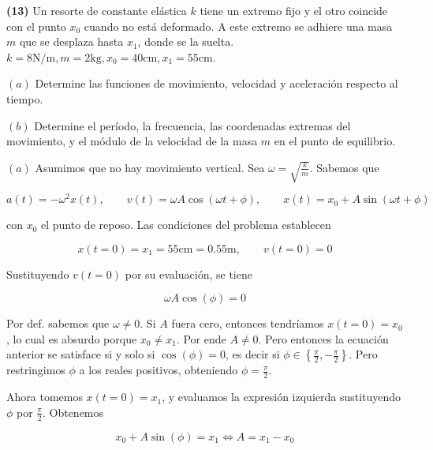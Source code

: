 \documentclass[12pt]{article}
\theoremstyle{definition}
\begin{document}
\pagebreak 

\begin{shaded}
    \textbf{(13)} Un resorte de constante elástica $k$ tiene un extremo fijo y
    el otro coincide con el punto $x_0$ cuando no está deformado. A este extremo
    se adhiere una masa $m$ que se desplaza hasta $x_1$, donde se la suelta. 
    $k = 8\text{N/m}, m = 2\text{kg}, x_0 = 40\text{cm}, x_1=55\text{cm}$.

    $(a)$ Determine las funciones de movimiento, velocidad y aceleración
    respecto al tiempo. 

    $(b)$ Determine el período, la frecuencia, las coordenadas extremas del
    movimiento, y el módulo de la velocidad de la masa $m$ en el punto de
    equilibrio.
\end{shaded}

$(a)$ Asumimos que no hay movimiento vertical. Sea $\omega = \sqrt{\frac{k}{m}}
$. Sabemos que

\begin{equation*}
    a(t) = -\omega^2 x(t), \qquad v(t) = \omega A \cos(\omega t + \phi), \qquad
    x(t) = x_0 + A \sin(\omega t + \phi)
\end{equation*}

con $x_0$ el punto de reposo. Las condiciones del problema establecen

\begin{equation*}
    x(t=0) = x_1 = 55\text{cm} = 0.55\text{m}, \qquad v(t=0) = 0
\end{equation*}

Sustituyendo $v(t = 0)$ por su evaluación, se tiene

\begin{equation*}
    \omega A \cos(\phi) = 0
\end{equation*}

Por def. sabemos que $\omega \neq 0$. Si $A$ fuera cero, entonces tendríamos
$x(t=0) = x_0$, lo cual es absurdo porque $x_0\neq x_1$. Por ende $A \neq 0$.
Pero entonces la ecuación anterior se satisface si y solo si $\cos(\phi) = 0$,
es decir si $\phi \in \left\{ \frac{\pi}{2}, -\frac{\pi}{2} \right\} $. Pero
restringimos $\phi$ a los reales positivos, obteniendo $\phi = \frac{\pi}{2}$.

Ahora tomemos $x(t = 0) = x_1$, y evaluamos la expresión izquierda sustituyendo
$\phi$ por $\frac{\pi}{2}$. Obtenemos

\begin{equation*}
    x_0 + A \sin(\phi) = x_1 \iff A = x_1 - x_0
\end{equation*}
\end{document}
